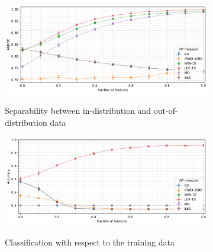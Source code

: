 \begin{figure}[t]
    \centering
    \begin{subfigure}[b]{0.9\textwidth}
        \centering
        \caption{\small Separability between in-distribution and out-of-distribution data}
        \includegraphics[width=\textwidth]{images/correlations/f_corr/trend-correlations-auroc(n_correlated)-covariance_0.20-distance_8-outliers_correlated_False-model_ED,IRWD-1000,kNN-10,LOF-10,MD,SED-aggregated.pdf}
        \label{fig:n_correlated-auroc}
    \end{subfigure}
    \begin{subfigure}[b]{0.9\textwidth}
        \centering
        \caption{\small Classification with respect to the training data}
        \includegraphics[width=\textwidth]{images/correlations/f_corr/trend-correlations-accuracy_95(n_correlated)-covariance_0.20-distance_8-outliers_correlated_False-model_ED,IRWD-1000,kNN-10,LOF-10,MD,SED-agg.pdf}
        \label{fig:n_correlated-accuracy}
    \end{subfigure}
    \begin{subfigure}[b]{0.495\textwidth}

\end{subfigure}
\end{figure}
